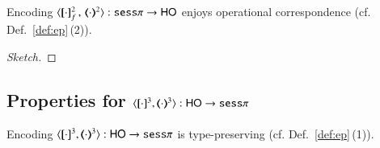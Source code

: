 \begin{proposition}\rm
	\label{app:enc_sesp_to_HO_oc}
	Encoding $\fencod{\cdot}{\cdot}{2}{f}: \sesp \to \HO$ 
	enjoys operational correspondence (cf. Def.~\ref{def:ep}\,(2)).
\end{proposition}

\begin{proof}[Sketch]
\end{proof}



\subsection{Properties for $\encod{\cdot}{\cdot}{3}: \HO \to \sesp$}
\label{app:enc_HO_to_sessp}

\begin{proposition}\rm
	\label{app:enc_HO_to_sessp_t}
	Encoding $\encod{\cdot}{\cdot}{3}: \HO \to \sesp$  is type-preserving (cf. Def.~\ref{def:ep}\,(1)).
\end{proposition}

